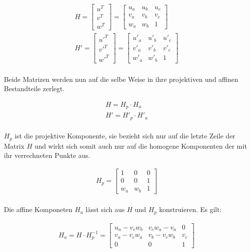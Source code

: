 \begin{gather}
H = \begin{bmatrix}
u^T\\v^T\\w^T
\end{bmatrix} =
\begin{bmatrix}
u_a&u_b&u_c\\
v_a&v_b&v_c\\
w_a&w_b&1
\end{bmatrix}\\
H' = \begin{bmatrix}
u'^T\\v'^T\\w'^T
\end{bmatrix} =
\begin{bmatrix}
u'_a&u'_b&u'_c\\
v'_a&v'_b&v'_c\\
w'_a&w'_b&1
\end{bmatrix}	
\end{gather}\\

Beide Matrizen werden nun auf die selbe Weise in ihre projektiven und affinen Bestandteile zerlegt.

\begin{gather}
	H = H_p \cdot H_a\\
	H' = H'_p \cdot H'_a
\end{gather}\\

$H_p$ ist die projektive Komponente, sie bezieht sich nur auf die letzte Zeile der Matrix $H$ und wirkt sich somit auch nur auf die homogene Komponenten der mit ihr verrechneten Punkte aus. 

\begin{gather}
	H_p = 
	\begin{bmatrix}
		1&0&0\\
		0&0&1\\
		w_a&w_b&1
	\end{bmatrix}
\end{gather}\\

Die affine Komponeten $H_a$ lässt sich aus $H$ und $H_p$ konstruieren. Es gilt:

\begin{gather}
	H_a= H \cdot H^{-1}_p = 
	\begin{bmatrix}
	u_a-v_cw_b&v_cw_a-v_a&0\\
	v_a-v_cw_a&v_b-v_cw_b&v_c\\
	0&0&1
	\end{bmatrix}
\end{gather}

